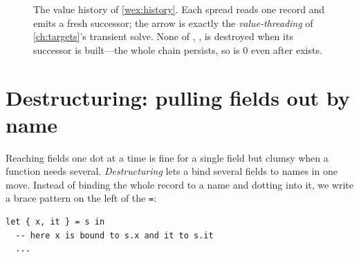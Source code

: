 \begin{figure}[t]
\centering
{}
\caption[A chain of fresh records]{The value history of
\cref{wex:history}. Each spread reads one record and emits a fresh successor;
the arrow is exactly the \emph{value-threading} of \cref{ch:targets}'s transient
solve. None of , ,  is destroyed when its successor is
built---the whole chain persists, so  is $0$ even
after  exists.}
\label{fig:chain}
\end{figure}

\section{Destructuring: pulling fields out by name}

Reaching fields one dot at a time is fine for a single field but clumsy when a
function needs several. \emph{Destructuring} lets a  bind several fields
to names in one move. Instead of binding the whole record to a name and dotting
into it, we write a brace pattern on the left of the \lstinline[style=l4style]|=|:

\begin{lstlisting}[style=l4style]
let { x, it } = s in
  -- here x is bound to s.x and it to s.it
  ...
\end{lstlisting}

